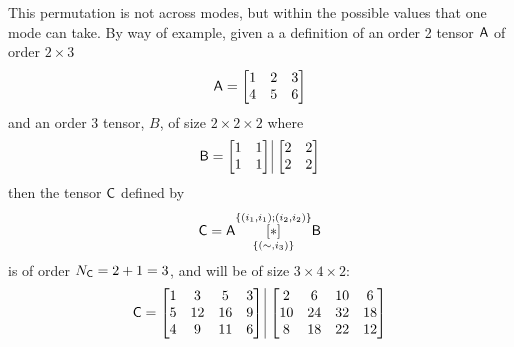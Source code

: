 This permutation is not across modes, but within the possible values that one mode can take.  By way of example, given a a definition of an order 2 tensor $\mathsf{A}$ of order $2\times 3$ 
\begin{equation}
\mathsf{A} = \begin{bmatrix}
1 & 2 & 3 \\
4 & 5 & 6 \\
\end{bmatrix}
\end{equation}
and an order 3 tensor, $B$, of size $2\times2\times2$ where
\begin{equation}
\tens{B} = \begin{bmatrix}
1 & 1 \\
1 & 1\\
\end{bmatrix}\, \vline \, \begin{bmatrix}
2 & 2 \\
2 & 2\\
\end{bmatrix}
\end{equation}
then the tensor $\mathsf{C}$ defined by
\begin{equation}
\mathsf{C} = \mathsf{A} \underset{\lbrace(\sim,i_3)\rbrace}{\overset{\lbrace (i_1,i_1);(i_2,i_2)\rbrace}{[ \ast ]}} {\mathsf{B}}
\end{equation}
is of order $N_{\mathsf{C}}=2+1 = 3$, and will be of size $3 \times 4 \times 2$:
\begin{equation}
\tens{C} = \begin{bmatrix}
1 & 3 & 5 & 3 \\
5 & 12 & 16 & 9\\
4 & 9 & 11 & 6
\end{bmatrix} \, \vline \, \begin{bmatrix}
2 & 6 & 10 & 6 \\
10 & 24 & 32 & 18\\
8 & 18 & 22 & 12
\end{bmatrix}
\end{equation}
